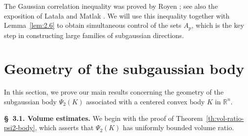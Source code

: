 \documentclass[10pt,a4paper]{amsart}
\numberwithin{equation}{section}
\begin{document}
The Gaussian correlation inequality was proved by Royen \cite{Royen-2014}; see also the exposition of Lata{\l}a and Matlak \cite{LM17}. 
We will use this inequality together with Lemma~\ref{lem:2.6} to obtain simultaneous control of the sets 
$A_p$, which is the key step in constructing large families of subgaussian directions.


\section{Geometry of the subgaussian body}\label{section:3}

In this section, we prove our main results concerning the geometry of the subgaussian body $\Psi_2(K)$ associated with a centered convex body $K$ in
$\mathbb{R}^n$. 

\medskip 

\noindent \textbf{\S~3.1. Volume estimates.} We begin with the proof of Theorem~\ref{th:vol-ratio-psi2-body}, which asserts that $\Psi_2(K)$ has uniformly bounded volume
ratio.
\end{document}
